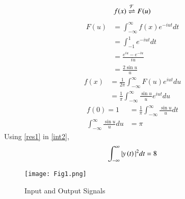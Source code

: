 \documentclass[journal,12pt,twocolumn]{IEEEtran}
\begin{document}
\begin{align}
    f(x) \overset{\mathcal{F}}{ \rightleftharpoons}{F(u)}
\end{align}
\begin{align}
    F(u) &= \int_{-\infty}^{\infty} f(x)e^{-iut}dt\\
    &= \int_{-1}^{1}e^{-iut}dt\\
    &= \frac{e^{iu} - e^{-iu}}{iu}\\
    &= \frac{2\sin{u}}{u}
\end{align}
\begin{align}
    f(x) &= \frac{1}{2\pi}\int_{-\infty}^{\infty} F(u)e^{iut}du\\
    &= \frac{1}{\pi}\int_{-\infty}^{\infty} \frac{\sin u}{u}e^{iut}du
\end{align}
\begin{align}
    f(0) = 1 &= \frac{1}{\pi}\int_{-\infty}^{\infty} \frac{\sin u}{u}dt\\
    \int_{-\infty}^{\infty} \frac{\sin u}{u}du &= \pi \label{res1}
\end{align}
Using \eqref{res1} in \eqref{int2},
\begin{align}
    \int_{-\infty}^{\infty} |y\left(t\right)|^2 dt = 8
\end{align}
\begin{figure}[htp]
    \centering
    \texttt{[image: Fig1.png]}
    \caption{Input and Output Signals}
    \label{fig:plot}
\end{figure}
\end{document}
